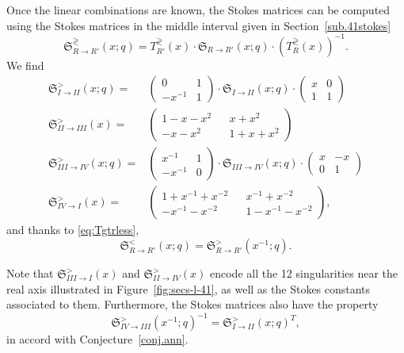 \documentclass[12pt,reqno]{amsart}
\theoremstyle{definition}
\def\-{\,-\,}
\def\mfS{\mathfrak{S}}
\begin{document}
Once the linear combinations are known, the Stokes matrices can be
computed using the Stokes matrices in the middle interval given in
Section~\ref{sub.41stokes}
\begin{equation}
  \mfS^{\gtrless}_{R\rightarrow R'}(x;q) =
  T_{R'}^{\gtrless}(x)\cdot
  \mfS_{R\rightarrow R'}(x;q)\cdot \left(T_{R}^{\gtrless}(x)\right)^{-1}.
\end{equation}
We find
\begin{align}
  \mfS^>_{I\rightarrow II}(x;q) =
    &\begin{pmatrix}
      0&1\\
      -x^{-1}&1
    \end{pmatrix}\cdot
               \mfS_{I\rightarrow II}(x;q)\cdot
               \begin{pmatrix}
                 x&0\\1&1
               \end{pmatrix}\\
  \mfS^>_{II\rightarrow III}(x) =
    &\begin{pmatrix}
      1-x-x^2 && x+x^2\\-x-x^2 && 1+x+x^2
    \end{pmatrix}\\
  \mfS^>_{III\rightarrow IV}(x;q) =
    &\begin{pmatrix}
      x^{-1}&1\\-x^{-1}&0
    \end{pmatrix}\cdot \mfS_{III\rightarrow IV}(x;q)\cdot
    \begin{pmatrix}
      x&-x\\0&1
    \end{pmatrix}\\
  \mfS^>_{IV\rightarrow I}(x)=
    &\begin{pmatrix}
      1+x^{-1}+x^{-2} && x^{-1}+x^{-2}\\-x^{-1}-x^{-2} &&
      1-x^{-1}-x^{-2}
    \end{pmatrix},
\end{align}
and thanks to \eqref{eq:Tgtrless}, 
\begin{equation}
  \mfS^{<}_{R\rightarrow R'}(x;q) =
  \mfS^{>}_{R\rightarrow R'}(x^{-1};q).
\end{equation}

Note that $\mfS^>_{III\rightarrow I}(x)$ and
$\mfS^>_{II\rightarrow IV}(x)$ encode all the 12 singularities near the
real axis illustrated in Figure~\ref{fig:secs-l-41}, as well as the
Stokes constants associated to them.  Furthermore, the Stokes matrices
also have the property
\begin{equation}
  \mfS^>_{IV\rightarrow III}(x^{-1};q)^{-1} = \mfS^>_{I\rightarrow II}(x;q)^T,
\end{equation}
in accord with Conjecture~\ref{conj.ann}.
\end{document}
